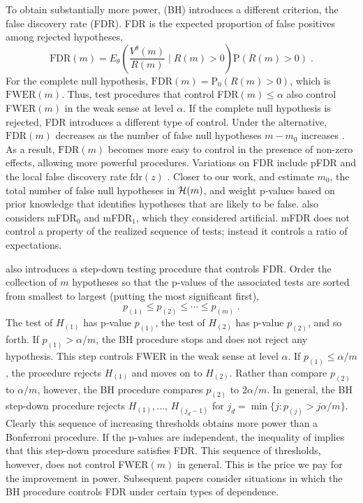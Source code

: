 \documentclass[12pt]{article}
\newcommand{\pr}{\mbox{P}}
\newcommand{\given}{\; \big| \;}
\begin{document}
To obtain substantially more power,
\citet{benjamini95} (BH) introduces a different criterion, the false
discovery rate (FDR).  FDR is the 
expected proportion of false positives among rejected hypotheses,
\begin{equation}
  \mbox{FDR}(m) = E_\theta \left(\frac{V^\theta(m)}{R(m)} \given R(m)>0 \right)
               \pr (R(m)>0)  \;.
\label{eq:fdr}
\end{equation}
For the complete null hypothesis, 
$\mbox{FDR}(m) = \pr_0(R(m)>0)$, which is $\mbox{FWER}(m)$.
Thus, test procedures that control FDR$(m) \le \alpha$ also control
FWER$(m)$ in the weak sense at level $\alpha$.   If the complete null
 hypothesis is rejected, FDR introduces a different type of control.  
 Under the alternative,
$\mbox{FDR}(m)$ decreases as the number of false null hypotheses
$m-m_0$ increases \citep{shaffer03}.  As a result, $\mbox{FDR}(m)$
becomes more easy to control in the presence of non-zero effects,
allowing more powerful procedures.  Variations on FDR include pFDR
\citep[which drops the term $\pr (R>0)$; see][]{storey02,storey03} and the
local false discovery rate $\mbox{fdr}(z)$ \citep[which estimates the
  false discovery rate as a function of the size of the test
  statistic; see ][]{efron07}.  Closer to our work,
 \citet{meinshausen04b} and \citet{rice06} estimate
$m_0$, the total number of false null hypotheses in ${\cal H}(m)$, 
and \citet{wasserman06} weight p-values based on prior knowledge
that identifies hypotheses that are likely to be false.  \citet{benjamini95} also considers mFDR${}_0$ and mFDR${}_1$, which they considered artificial.  mFDR does not control a property of
 the realized sequence of tests; instead it controls a ratio of
 expectations. 

 
\citet{benjamini95} also introduces a step-down testing procedure that
 controls FDR. Order the collection of $m$ hypotheses so that
 the p-values of the associated tests are sorted from
 smallest to largest (putting the most significant first),
\begin{equation}
  p_{(1)} \le p_{(2)} \le \cdots \le p_{(m)} \;.
\label{eq:ordered:pv}
\end{equation}
The test of $H_{(1)}$ has p-value $p_{(1)}$, the test of $H_{(2)}$ has
p-value $p_{(2)}$, and so forth.  If $p_{(1)} > \alpha/m$, the BH procedure stops
and does not reject any hypothesis.  This step controls FWER  in
the weak sense at level $\alpha$.  If $p_{(1)} \le \alpha/m$, the
procedure rejects $H_{(1)}$ and moves on to $H_{(2)}$.  Rather
than compare $p_{(2)}$ to $\alpha/m$, however, the BH procedure
compares $p_{(2)}$ to $2 \alpha/m$.  In general, the BH
step-down procedure rejects $H_{(1)}, \ldots, \, H_{(j_d - 1)}$ for  
$j_d = \min\{j:p_{(j)} > j\alpha / m\}$.
Clearly this sequence of increasing thresholds obtains more power than 
a Bonferroni procedure.  If
the p-values are independent, the inequality of \citet{simes86}
implies that this step-down procedure satisfies FDR.  This sequence of
thresholds, however, does not control FWER$(m)$ in general.  This is
the price we pay for the improvement in power.  Subsequent papers
\citep[such as][]{benjamini01, sarkar98, troendle96} consider
situations in which the BH procedure controls FDR under certain types
of dependence.
\end{document}
